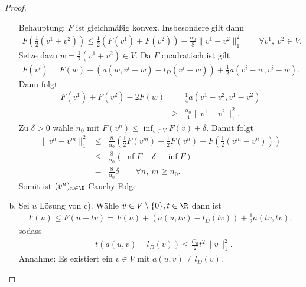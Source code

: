 \begin{proof}
\begin{enumerate}[a)]
        Behauptung: $F$ ist gleichmä\ss{}ig konvex. Insbesondere gilt dann
        \begin{eqnarray*}
                F\left(\frac{1}{2} \left(v^1 + v^2\right)\right)
            \le \frac{1}{2} (F(v^1) + F(v^2)) - \frac{\alpha_0}{8}
                \| v^1 - v^2\|_1^2 \qquad \forall v^1, \ v^2 \in V.
        \end{eqnarray*}
        Setze dazu $w = \frac{1}{2} \left(v^1 + v^2\right)\in V$.
        Da $F$ quadratisch ist gilt
        \begin{eqnarray*}
              F\left(v^i\right)
            = F(w) + \left(a\left(w, v^i - w\right)
              - l_D\left(v^i - w\right)\right)
              + \frac{1}{2} a\left(v^i - w, v^i - w\right).
        \end{eqnarray*}
        Dann folgt
        \begin{eqnarray*}
                F\left(v^1\right) + F\left(v^2\right) - 2 F(w)
            &=& \frac{1}{4} a\left(v^1 - v^2, v^1 - v^2\right) \\
            &\ge& \frac{\alpha_0}{4} \|v^1 - v^2\|_1^2.
        \end{eqnarray*}
        Zu $\delta > 0$ wähle $n_0$ mit $F\left(v^n\right) \le \inf_{v \in V} F(v)
        + \delta$. Damit folgt
        \begin{eqnarray*}
                  \|v^n - v^m\|_1^2
            &\le& \frac{8}{\alpha_0} \left(\frac{1}{2} F\left(v^m\right)
                  + \frac{1}{2} F\left(v^n\right)
                  - F\left(\frac{1}{2}\left(v^m - v^n\right)\right)\right) \\
            &\le& \frac{8}{\alpha_0} (\inf F + \delta - \inf F) \\
            &=& \frac{8}{\alpha_0} \delta
            \qquad \forall n, \ m \ge n_0.
        \end{eqnarray*}
        Somit ist $(v^n)_{n\in \N}$ Cauchy-Folge.
      \item
        Sei $u$ Lösung von c).
        Wähle $v\in V \setminus \{0\}, t\in \R$ dann ist
        \begin{eqnarray*}
                F(u)
            \le F(u + tv)
            =   F(u) + (a(u, tv) - l_D(tv)) + \frac{1}{2} a(tv, tv),
        \end{eqnarray*}
        sodass
        \begin{eqnarray*}
            -t(a(u, v) - l_D(v)) \le \frac{C_a}{2} t^2 \|v\|_1^2.
        \end{eqnarray*}
        Annahme: Es existiert ein $v\in V$ mit $a(u, v) \neq l_D(v)$.


\end{enumerate}
\end{proof}
